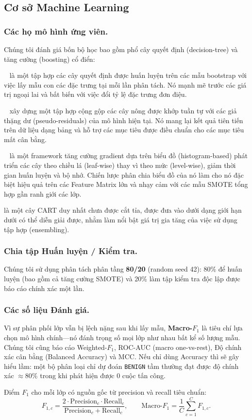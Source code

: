\subsection{Cơ sở Machine Learning}
\label{sec:bg-ml}

\subsubsection*{Các họ mô hình ứng viên.}
Chúng tôi đánh giá bốn bộ học bao gồm phổ cây quyết định (decision-tree) và tăng cường (boosting) cổ điển:
\begin{description}[leftmargin=1.2em,itemsep=2pt,topsep=2pt]
    \item[Random Forest (RF)]~\cite{ref_rf} là một tập hợp các cây quyết định được huấn luyện trên các mẫu bootstrap với việc lấy mẫu con các đặc trưng tại mỗi lần phân tách. Nó mạnh mẽ trước các giá trị ngoại lai và bất biến với việc đổi tỷ lệ đặc trưng đơn điệu.
    \item[XGBoost]~\cite{ref_xgboost} xây dựng một tập hợp cộng gộp các cây nông được khớp tuần tự với các giả thặng dư (pseudo-residuals) của mô hình hiện tại. Nó mang lại kết quả tiên tiến trên dữ liệu dạng bảng và hỗ trợ các mục tiêu được điều chuẩn cho các mục tiêu mất cân bằng.
    \item[LightGBM]~\cite{ref_lightgbm} là một framework tăng cường gradient dựa trên biểu đồ (histogram-based) phát triển các cây theo chiều lá (leaf-wise) thay vì theo mức (level-wise), giảm thời gian huấn luyện và bộ nhớ. Chiến lược phân chia biểu đồ của nó làm cho nó đặc biệt hiệu quả trên các Feature Matrix lớn và nhạy cảm với các mẫu SMOTE tổng hợp gần ranh giới các lớp.
    \item[Cây quyết định (Decision Tree - DT)] là một cây CART duy nhất chưa được cắt tỉa, được đưa vào dưới dạng giới hạn dưới có thể diễn giải được, nhằm làm nổi bật giá trị gia tăng của việc sử dụng tập hợp (ensembling).
\end{description}

\subsubsection*{Chia tập Huấn luyện / Kiểm tra.}
Chúng tôi sử dụng phân tách phân tầng \textbf{80/20} (random seed 42): 80\% để huấn luyện (bao gồm cả tăng cường SMOTE) và 20\% làm tập kiểm tra độc lập được báo cáo chính xác một lần.

\subsubsection*{Các số liệu Đánh giá.}
Vì sự phân phối lớp vẫn bị lệch nặng sau khi lấy mẫu, \textbf{Macro-$F_1$} là tiêu chí lựa chọn mô hình chính---nó đánh trọng số mọi lớp như nhau bất kể số lượng mẫu. Chúng tôi cũng báo cáo Weighted-$F_1$, ROC-AUC (macro one-vs-rest), Độ chính xác cân bằng (Balanced Accuracy) và MCC. Nếu chỉ dùng Accuracy thì sẽ gây hiểu lầm: một bộ phân loại chỉ dự đoán \texttt{BENIGN} tầm thường đạt được độ chính xác $\approx 80\%$ trong khi phát hiện được 0 cuộc tấn công.

Điểm $F_1$ cho mỗi lớp có nguồn gốc từ precision và recall tiêu chuẩn:
\begin{equation}
    F_{1,c} = \frac{2 \cdot \text{Precision}_c \cdot \text{Recall}_c}{\text{Precision}_c + \text{Recall}_c}, \qquad \text{Macro-}F_1 = \frac{1}{C}\sum_{c=1}^{C} F_{1,c}.
\end{equation}

